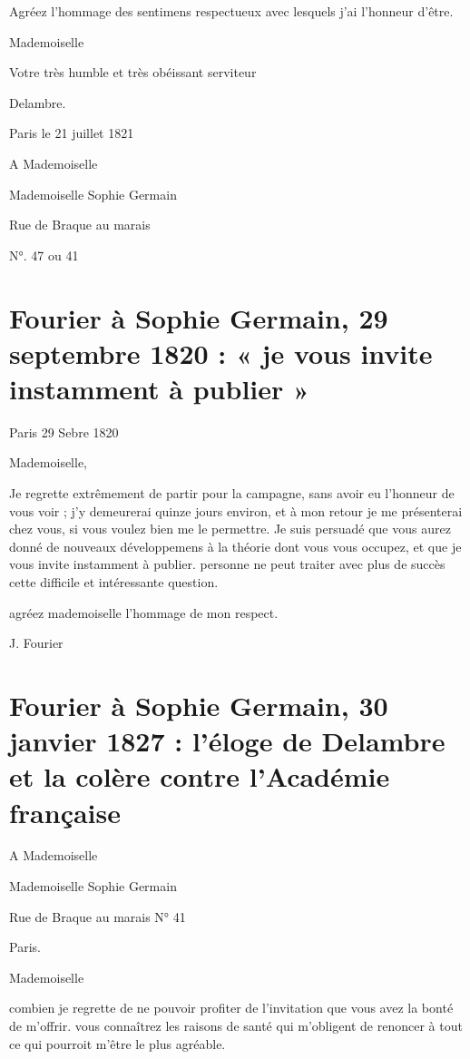 \documentclass[11pt,a4paper]{article}
\begin{document}
Agréez l'hommage des sentimens respectueux avec lesquels j'ai l'honneur
d'être.

Mademoiselle

Votre très humble et très obéissant serviteur

Delambre.

Paris le 21 juillet 1821

A Mademoiselle

Mademoiselle Sophie Germain

Rue de Braque au marais

N°. 47 ou 41


\section{Fourier à Sophie Germain, 29 septembre 1820 : « je vous invite instamment à publier »}

Paris 29 Sebre 1820

Mademoiselle,

Je regrette extrêmement de partir pour la campagne, sans avoir eu l'honneur
de vous voir ; j'y demeurerai quinze jours environ, et à mon retour je me
présenterai chez vous, si vous voulez bien me le permettre. Je suis persuadé
que vous aurez donné de nouveaux développemens à la théorie dont vous vous
occupez, et que je vous invite instamment à publier. personne ne peut traiter
avec plus de succès cette difficile et intéressante question.

agréez mademoiselle l'hommage de mon respect.

J. Fourier

\section{Fourier à Sophie Germain, 30 janvier 1827 : l'éloge de Delambre et la colère contre l'Académie française}

A Mademoiselle

Mademoiselle Sophie Germain

Rue de Braque au marais N° 41

Paris.

Mademoiselle

combien je regrette de ne pouvoir profiter de l'invitation que vous avez la
bonté de m'offrir. vous connaîtrez les raisons de santé qui m'obligent de
renoncer à tout ce qui pourroit m'être le plus agréable.
\end{document}
